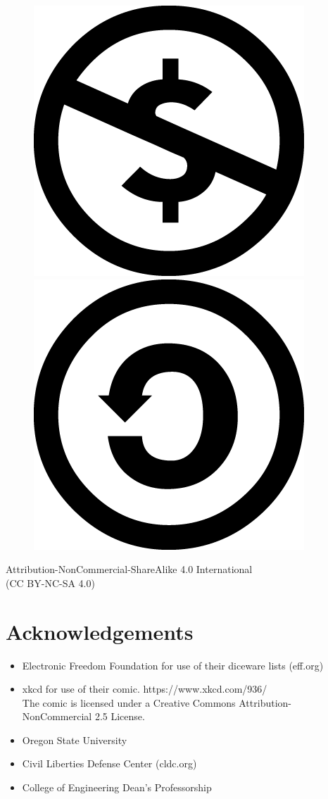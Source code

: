 \documentclass[10pt, oneside]{book}
\begin{document}
\begin{figure}[h]
	\includegraphics[scale=0.1]{nc.png}
	\includegraphics[scale=0.1]{sa.png}
\end{figure}
	Attribution-NonCommercial-ShareAlike 4.0 International\\ (CC BY-NC-SA 4.0)
	\section*{Acknowledgements}
	\begin{itemize}
		\item Electronic Freedom Foundation for use of their diceware lists (eff.org)\\
		\item xkcd for use of their comic. https://www.xkcd.com/936/\\
		The comic is licensed under a Creative Commons Attribution-NonCommercial 2.5 License.
		\item Oregon State University\\
		\item Civil Liberties Defense Center (cldc.org)\\
		\item College of Engineering Dean's Professorship\\
	\end{itemize}
	
\end{document}
